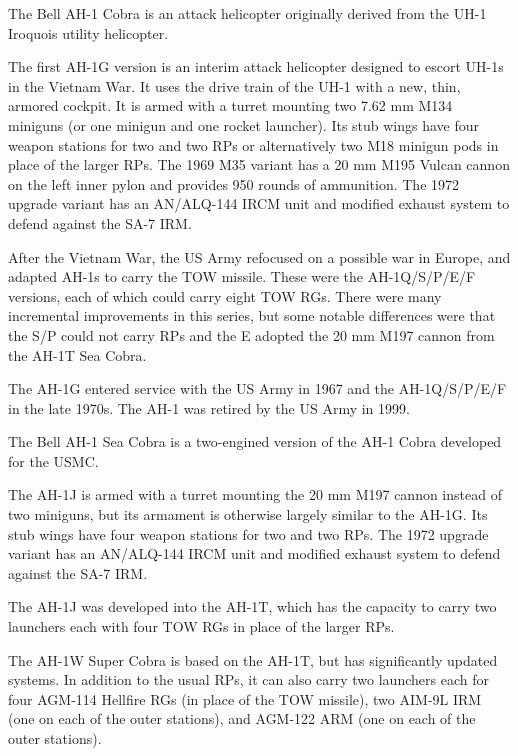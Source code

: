 


The Bell AH-1 Cobra is an attack helicopter originally derived from the UH-1 Iroquois utility helicopter.

The first AH-1G version is an interim attack helicopter designed to escort UH-1s in the Vietnam War. It uses the drive train of the UH-1 with a new, thin, armored cockpit. It is armed with a turret mounting two 7.62 mm M134 miniguns (or one minigun and one rocket launcher). Its stub wings have four weapon stations for two  and two  RPs or alternatively two M18 minigun pods in place of the larger RPs. The 1969 M35 variant has a 20 mm M195 Vulcan cannon on the left inner pylon and provides 950 rounds of ammunition. The 1972 upgrade variant has an AN/ALQ-144 IRCM unit and modified exhaust system to defend against the SA-7 IRM.

After the Vietnam War, the US Army refocused on a possible war in Europe, and adapted AH-1s to carry the TOW missile. These were the AH-1Q/S/P/E/F versions, each of which could carry eight TOW RGs. There were many incremental improvements in this series, but some notable differences were that the S/P could not carry RPs and the E adopted the 20 mm M197 cannon from the AH-1T Sea Cobra.

The AH-1G entered service with the US Army in 1967 and the AH-1Q/S/P/E/F in the late 1970s. The AH-1 was retired by the US Army in 1999.


The Bell AH-1 Sea Cobra is a two-engined version of the AH-1 Cobra developed for the USMC.

The AH-1J is armed with a turret mounting the 20 mm M197 cannon instead of two miniguns, but its armament is otherwise largely similar to the AH-1G. Its stub wings have four weapon stations for two  and two  RPs. The 1972 upgrade variant has an AN/ALQ-144 IRCM unit and modified exhaust system to defend against the SA-7 IRM.

The AH-1J was developed into the AH-1T, which has the capacity to carry two launchers each with four TOW RGs in place of the larger RPs.

The AH-1W Super Cobra is based on the AH-1T, but has significantly updated systems. In addition to the usual RPs, it can also carry two launchers each for four AGM-114 Hellfire RGs (in place of the TOW missile), two AIM-9L IRM (one on each of the outer stations), and AGM-122 ARM (one on each of the outer stations).

